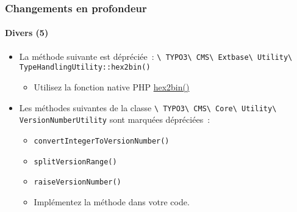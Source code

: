 \begin{frame}[fragile]
	\frametitle{Changements en profondeur}
	\framesubtitle{Divers (5)}

	\begin{itemize}

		\item La méthode suivante est dépréciée~:\newline
			\smaller\texttt{\textbackslash
				TYPO3\textbackslash
				CMS\textbackslash
				Extbase\textbackslash
				Utility\textbackslash
				TypeHandlingUtility::hex2bin()}\normalsize

			\begin{itemize}\smaller
				\item[\ding{228}] Utilisez la fonction native PHP \href{https://www.php.net/manual/en/function.hex2bin.php}{hex2bin()}
			\end{itemize}\normalsize

		\item Les méthodes suivantes de la classe
			\smaller\texttt{\textbackslash
				TYPO3\textbackslash
				CMS\textbackslash
				Core\textbackslash
				Utility\textbackslash
				VersionNumberUtility}\normalsize\newline
			sont marquées dépréciées~:

			\begin{itemize}
				\item \texttt{convertIntegerToVersionNumber()}
				\item \texttt{splitVersionRange()}
				\item \texttt{raiseVersionNumber()}
			\end{itemize}

			\begin{itemize}\smaller
				\item[\ding{228}] Implémentez la méthode dans votre code.
			\end{itemize}\normalsize

	\end{itemize}

\end{frame}


